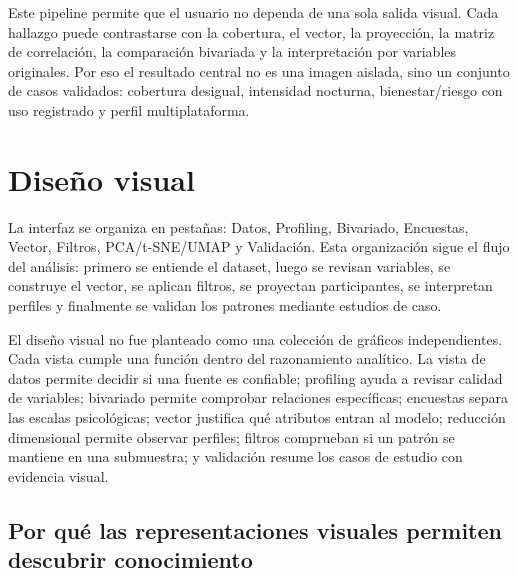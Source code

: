 \documentclass[12pt,a4paper]{article}
\begin{document}
Este pipeline permite que el usuario no dependa de una sola salida visual. Cada hallazgo puede contrastarse con la cobertura, el vector, la proyecci\'on, la matriz de correlaci\'on, la comparaci\'on bivariada y la interpretaci\'on por variables originales. Por eso el resultado central no es una imagen aislada, sino un conjunto de casos validados: cobertura desigual, intensidad nocturna, bienestar/riesgo con uso registrado y perfil multiplataforma.

\section{Dise\~no visual}

La interfaz se organiza en pesta\~nas: Datos, Profiling, Bivariado, Encuestas, Vector, Filtros, PCA/t-SNE/UMAP y Validaci\'on. Esta organizaci\'on sigue el flujo del an\'alisis: primero se entiende el dataset, luego se revisan variables, se construye el vector, se aplican filtros, se proyectan participantes, se interpretan perfiles y finalmente se validan los patrones mediante estudios de caso.

El dise\~no visual no fue planteado como una colecci\'on de gr\'aficos independientes. Cada vista cumple una funci\'on dentro del razonamiento anal\'itico. La vista de datos permite decidir si una fuente es confiable; profiling ayuda a revisar calidad de variables; bivariado permite comprobar relaciones espec\'ificas; encuestas separa las escalas psicol\'ogicas; vector justifica qu\'e atributos entran al modelo; reducci\'on dimensional permite observar perfiles; filtros comprueban si un patr\'on se mantiene en una submuestra; y validaci\'on resume los casos de estudio con evidencia visual.

\subsection{Por qu\'e las representaciones visuales permiten descubrir conocimiento}
\end{document}
